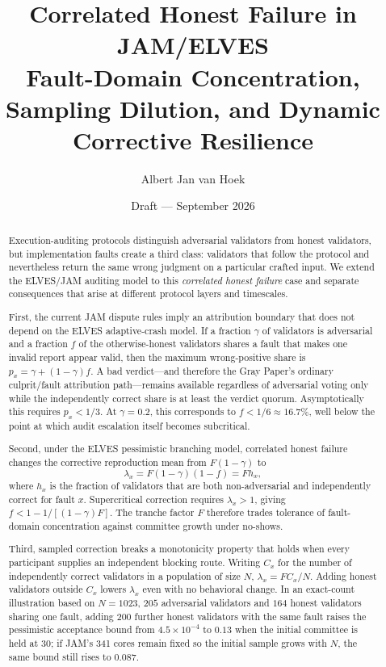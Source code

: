 \documentclass[11pt]{article}
\title{\textbf{Correlated Honest Failure in JAM/ELVES}\\
\large Fault-Domain Concentration, Sampling Dilution, and Dynamic Corrective Resilience}
\author{Albert Jan van Hoek}
\date{Draft --- September 2026}
\begin{document}
\maketitle

\begin{abstract}
Execution-auditing protocols distinguish adversarial validators from honest validators, but implementation faults create a third class: validators that follow the protocol and nevertheless return the same wrong judgment on a particular crafted input. We extend the ELVES/JAM auditing model to this \emph{correlated honest failure} case and separate consequences that arise at different protocol layers and timescales.

First, the current JAM dispute rules imply an attribution boundary that does not depend on the ELVES adaptive-crash model. If a fraction \(\gamma\) of validators is adversarial and a fraction \(f\) of the otherwise-honest validators shares a fault that makes one invalid report appear valid, then the maximum wrong-positive share is \(p_x=\gamma+(1-\gamma)f\). A bad verdict---and therefore the Gray Paper's ordinary culprit/fault attribution path---remains available regardless of adversarial voting only while the independently correct share is at least the verdict quorum. Asymptotically this requires \(p_x<1/3\). At \(\gamma=0.2\), this corresponds to \(f<1/6\approx16.7\%\), well below the point at which audit escalation itself becomes subcritical.

Second, under the ELVES pessimistic branching model, correlated honest failure changes the corrective reproduction mean from \(F(1-\gamma)\) to
\[
\lambda_x=F(1-\gamma)(1-f)=Fh_x,
\]
where \(h_x\) is the fraction of validators that are both non-adversarial and independently correct for fault \(x\). Supercritical correction requires \(\lambda_x>1\), giving \(f<1-1/[(1-\gamma)F]\). The tranche factor \(F\) therefore trades tolerance of fault-domain concentration against committee growth under no-shows.

Third, sampled correction breaks a monotonicity property that holds when every participant supplies an independent blocking route. Writing \(C_x\) for the number of independently correct validators in a population of size \(N\), \(\lambda_x=FC_x/N\). Adding honest validators outside \(C_x\) lowers \(\lambda_x\) even with no behavioral change. In an exact-count illustration based on \(N=1023\), \(205\) adversarial validators and \(164\) honest validators sharing one fault, adding 200 further honest validators with the same fault raises the pessimistic acceptance bound from \(4.5\times10^{-4}\) to \(0.13\) when the initial committee is held at 30; if JAM's 341 cores remain fixed so the initial sample grows with \(N\), the same bound still rises to \(0.087\).


\end{abstract}
\end{document}
